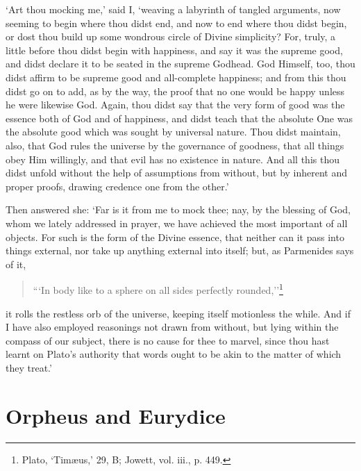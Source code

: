 \documentclass[11pt]{book}
\begin{document}
`Art thou mocking me,' said I, `weaving a labyrinth of tangled
arguments, now seeming to begin where thou didst end, and now to end
where thou didst begin, or dost thou build up some wondrous circle of
Divine simplicity? For, truly, a little before thou didst begin with
happiness, and say it was the supreme good, and didst declare it to be
seated in the supreme Godhead. God Himself, too, thou didst affirm to be
supreme good and all-complete happiness; and from this thou didst go on
to add, as by the way, the proof that no one would be happy unless he
were likewise God. Again, thou didst say that the very form of good was
the essence both of God and of happiness, and didst teach that the
absolute One was the absolute good which was sought by universal nature.
Thou didst maintain, also, that God rules the universe by the governance
of goodness, that all things obey Him willingly, and that evil has no
existence in nature. And all this thou didst unfold without the help of
assumptions from without, but by inherent and proper proofs, drawing
credence one from the other.'

Then answered she: `Far is it from me to mock thee; nay, by the blessing
of God, whom we lately addressed in prayer, we have achieved the most
important of all objects. For such is the form of the Divine essence,
that neither can it pass into things external, nor take up anything
external into itself; but, as Parmenides says of it,

\begin{quote}
  ```In body like to a sphere on all sides perfectly rounded,''\footnote{Plato, ‘Timæus,’ 29, B; Jowett, vol. iii., p. 449.}
\end{quote}

it rolls the restless orb of the universe, keeping itself motionless the
while. And if I have also employed reasonings not drawn from without,
but lying within the compass of our subject, there is no cause for thee
to marvel, since thou hast learnt on Plato's authority that words ought
to be akin to the matter of which they treat.'



\section{Orpheus and Eurydice}
\end{document}

